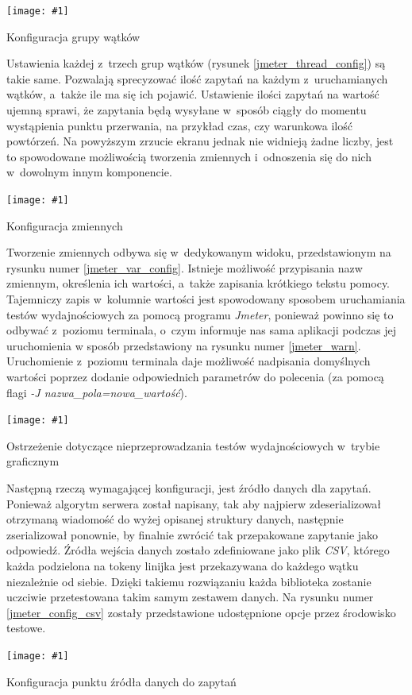 \documentclass[12pt]{article}
\newcommand{\n}{\newline}
\newcommand{\putss}[3]{
\begin{captioned}[H]
	\centering
	\texttt{[image: \#1]}
	\caption{#2}
	\label{#3}
	\medskip
\end{captioned}
}
\newcommand{\nonpl}[1]{{\it #1}}
\newcommand{\code}[1]{{\it #1}}
\newcommand{\Jmeter}{\nonpl{Jmeter}\texttrademark}
\begin{document}
{{{				\putss{./img/jmeter_ss/thread_group_config.png}{ Konfiguracja grupy wątków}{jmeter_thread_config}

				Ustawienia każdej z~trzech grup wątków (rysunek \ref{jmeter_thread_config}) są takie same. Pozwalają sprecyzować ilość zapytań na każdym z~uruchamianych wątków, a~także ile ma się ich pojawić.
				Ustawienie ilości zapytań na wartość ujemną sprawi, że zapytania będą wysyłane w~sposób ciągły do momentu wystąpienia punktu przerwania, na przykład czas, czy warunkowa
				ilość powtórzeń. Na powyższym zrzucie ekranu jednak nie widnieją żadne liczby, jest to spowodowane możliwością tworzenia zmiennych i~odnoszenia się do nich w~dowolnym innym
				komponencie.\n

				\putss{./img/jmeter_ss/variables.png}{ Konfiguracja zmiennych}{jmeter_var_config}

				Tworzenie zmiennych odbywa się w~dedykowanym widoku, przedstawionym na rysunku numer \ref{jmeter_var_config}. Istnieje możliwość przypisania nazw zmiennym, określenia ich wartości,
				a~także zapisania krótkiego tekstu pomocy. Tajemniczy zapis w~kolumnie wartości jest spowodowany sposobem uruchamiania testów wydajnościowych za pomocą programu \Jmeter,
				ponieważ powinno się to odbywać z~poziomu terminala, o~czym informuje nas sama aplikacji podczas jej uruchomienia w sposób przedstawiony na rysunku numer \ref{jmeter_warn}.
				Uruchomienie z~poziomu terminala daje możliwość nadpisania domyślnych wartości poprzez dodanie odpowiednich parametrów do polecenia (za pomocą flagi \code{-J nazwa\_pola=nowa\_wartość}).\n

				\putss{./img/jmeter_ss/jmeter_gui_warn.png}{ Ostrzeżenie dotyczące nieprzeprowadzania testów wydajnościowych w~trybie graficznym}{jmeter_warn}

				Następną rzeczą wymagającej konfiguracji, jest źródło danych dla zapytań. Ponieważ algorytm serwera został napisany, tak aby najpierw zdeserializował otrzymaną
				wiadomość do wyżej opisanej struktury danych, następnie zserializował ponownie, by finalnie zwrócić tak przepakowane zapytanie jako odpowiedź. Źródła wejścia danych
				zostało zdefiniowane jako plik \nonpl{CSV}, którego każda podzielona na tokeny linijka jest przekazywana do każdego wątku niezależnie od siebie. Dzięki takiemu rozwiązaniu
				każda biblioteka zostanie uczciwie przetestowana takim samym zestawem danych. Na rysunku numer \ref{jmeter_config_csv} zostały przedstawione udostępnione opcje przez środowisko testowe.\n

				\putss{./img/jmeter_ss/csv_config.png}{ Konfiguracja punktu źródła danych do zapytań}{jmeter_config_csv}

}}}
\end{document}
